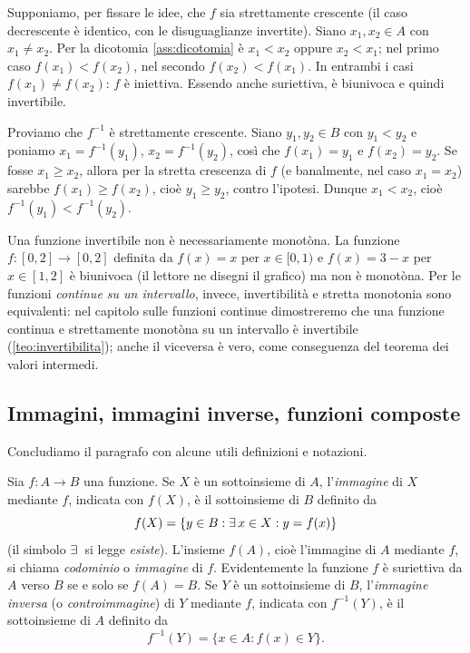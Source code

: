 \begin{dimostrazione}
Supponiamo, per fissare le idee, che $f$ sia strettamente crescente (il caso
decrescente è identico, con le disuguaglianze invertite). Siano $x_{1},x_{2}\in A$ con
$x_{1}\neq x_{2}$. Per la dicotomia \ref{ass:dicotomia} è $x_{1}<x_{2}$ oppure
$x_{2}<x_{1}$; nel primo caso $f(x_{1})<f(x_{2})$, nel secondo $f(x_{2})<f(x_{1})$. In
entrambi i casi $f(x_{1})\neq f(x_{2})$: $f$ è iniettiva. Essendo anche suriettiva, è
biunivoca e quindi invertibile.

Proviamo che $f^{-1}$ è strettamente crescente. Siano $y_{1},y_{2}\in B$ con
$y_{1}<y_{2}$ e poniamo $x_{1}=f^{-1}(y_{1})$, $x_{2}=f^{-1}(y_{2})$, così che
$f(x_{1})=y_{1}$ e $f(x_{2})=y_{2}$. Se fosse $x_{1}\ge x_{2}$, allora per la stretta
crescenza di $f$ (e banalmente, nel caso $x_{1}=x_{2}$) sarebbe $f(x_{1})\ge
f(x_{2})$, cioè $y_{1}\ge y_{2}$, contro l'ipotesi. Dunque $x_{1}<x_{2}$, cioè
$f^{-1}(y_{1})<f^{-1}(y_{2})$.
\end{dimostrazione}

\begin{attenzione}
Una funzione invertibile non è necessariamente monotòna. La funzione
$f\colon[0,2]\to[0,2]$ definita da $f(x)=x$ per $x\in[0,1)$ e $f(x)=3-x$ per
$x\in[1,2]$ è biunivoca (il lettore ne disegni il grafico) ma non è monotòna. Per le
funzioni \emph{continue su un intervallo}, invece, invertibilità e stretta monotonia sono
equivalenti: nel capitolo sulle funzioni continue dimostreremo che una funzione continua
e strettamente monotòna su un intervallo è invertibile (\cref{teo:invertibilita}); anche
il viceversa è vero, come conseguenza del teorema dei valori intermedi.
\end{attenzione}

\subsection{Immagini, immagini inverse, funzioni composte}

Concludiamo il paragrafo con alcune utili definizioni e notazioni.

\begin{definizione}
Sia $f\colon A\to B$ una funzione. Se $X$ è un sottoinsieme di $A$, l'\emph{immagine}
di $X$ mediante $f$, indicata con $f(X)$, è il sottoinsieme di $B$ definito da
\begin{equation}\label{eq:immagine}
  f(X)=\{y\in B : \exists\, x\in X : y=f(x)\}
\end{equation}
(il simbolo $\exists\,$ si legge \emph{esiste}). L'insieme $f(A)$, cioè l'immagine di $A$
mediante $f$, si chiama \emph{codominio} o \emph{immagine} di $f$. Evidentemente la
funzione $f$ è suriettiva da $A$ verso $B$ se e solo se $f(A)=B$. Se $Y$ è un
sottoinsieme di $B$, l'\emph{immagine inversa} (o \emph{controimmagine}) di $Y$ mediante
$f$, indicata con $f^{-1}(Y)$, è il sottoinsieme di $A$ definito da
\begin{equation}\label{eq:controimmagine}
  f^{-1}(Y)=\{x\in A : f(x)\in Y\}.
\end{equation}
\end{definizione}

